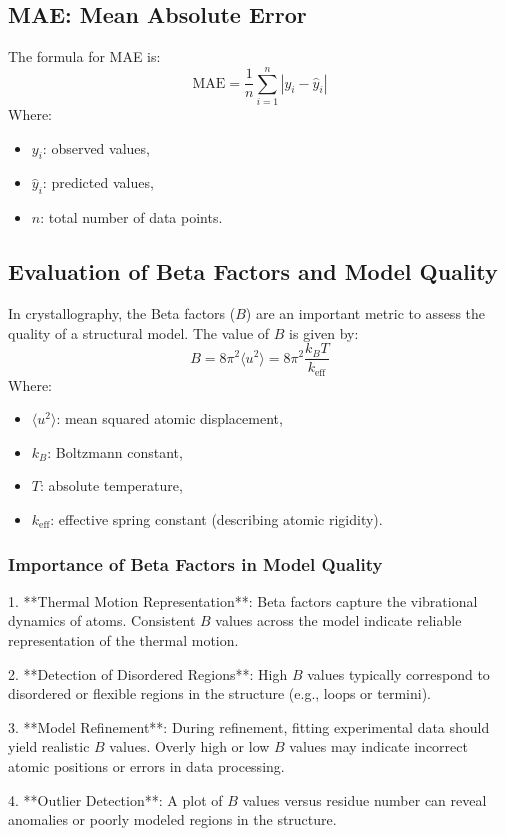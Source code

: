 \documentclass[English, Lau, oneside]{sapthesis}
\begin{document}
\begin{itemize}
\subsection*{MAE: Mean Absolute Error}
The formula for MAE is:
\[
\text{MAE} = \frac{1}{n} \sum_{i=1}^n |y_i - \hat{y}_i|
\]
Where:
\begin{itemize}
    \item \(y_i\): observed values,
    \item \(\hat{y}_i\): predicted values,
    \item \(n\): total number of data points.
\end{itemize}

\subsection*{Evaluation of Beta Factors and Model Quality}
In crystallography, the Beta factors (\(B\)) are an important metric to assess the quality of a structural model. The value of \(B\) is given by:
\[
B = 8\pi^2 \langle u^2 \rangle = 8\pi^2 \frac{k_B T}{k_{\text{eff}}}
\]
Where:
\begin{itemize}
    \item \(\langle u^2 \rangle\): mean squared atomic displacement,
    \item \(k_B\): Boltzmann constant,
    \item \(T\): absolute temperature,
    \item \(k_{\text{eff}}\): effective spring constant (describing atomic rigidity).
\end{itemize}

\subsubsection*{Importance of Beta Factors in Model Quality}
1. **Thermal Motion Representation**:
    Beta factors capture the vibrational dynamics of atoms. Consistent \(B\) values across the model indicate reliable representation of the thermal motion.
    
2. **Detection of Disordered Regions**:
    High \(B\) values typically correspond to disordered or flexible regions in the structure (e.g., loops or termini).

3. **Model Refinement**:
    During refinement, fitting experimental data should yield realistic \(B\) values. Overly high or low \(B\) values may indicate incorrect atomic positions or errors in data processing.

4. **Outlier Detection**:
    A plot of \(B\) values versus residue number can reveal anomalies or poorly modeled regions in the structure.


\end{itemize}
\end{document}
